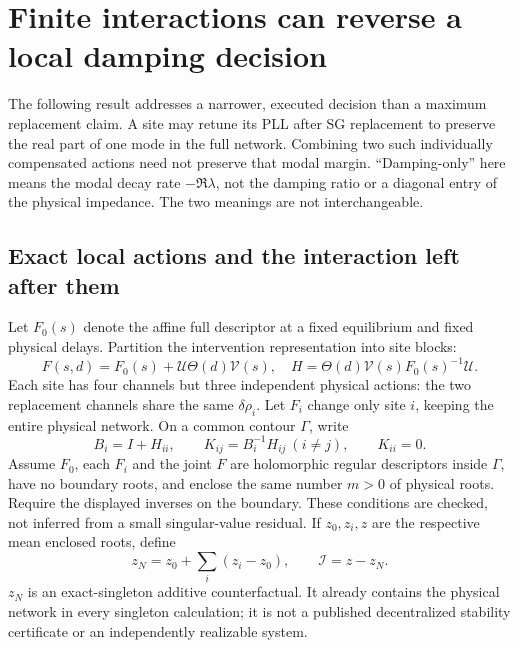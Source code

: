 \documentclass[11pt]{article}
\begin{document}
\section{Finite interactions can reverse a local damping decision}
\label{sec:decision}
The following result addresses a narrower, executed decision than a maximum
replacement claim. A site may retune its PLL after SG replacement to preserve
the real part of one mode in the full network. Combining two such individually
compensated actions need not preserve that modal margin. ``Damping-only'' here
means the modal decay rate $-\Re\lambda$, not the damping ratio or a diagonal
entry of the physical impedance. The two meanings are not interchangeable.

\subsection{Exact local actions and the interaction left after them}
Let $F_0(s)$ denote the affine full descriptor at a fixed equilibrium and fixed
physical delays. Partition the intervention representation into site blocks:
\begin{equation}
 F(s,d)=F_0(s)+\mathcal U\Theta(d)\mathcal V(s),\quad
 H=\Theta(d)\mathcal V(s)F_0(s)^{-1}\mathcal U .
\end{equation}
Each site has four channels but three independent physical actions: the two
replacement channels share the same $\delta\rho_i$. Let $F_i$ change only
site $i$, keeping the entire physical network. On a common contour $\Gamma$,
write
\begin{equation}
 B_i=I+H_{ii},\qquad K_{ij}=B_i^{-1}H_{ij}\ (i\ne j),\qquad K_{ii}=0.
\end{equation}
Assume $F_0$, each $F_i$ and the joint $F$ are holomorphic regular descriptors
inside $\Gamma$, have no boundary roots, and enclose the same number $m>0$ of
physical roots. Require the displayed inverses on the boundary. These
conditions are checked, not inferred from a small singular-value residual.
If $z_0,z_i,z$ are the respective mean enclosed roots, define
\begin{equation}
 z_N=z_0+\sum_i(z_i-z_0),\qquad \mathcal I=z-z_N .
 \label{eq:singleton-counterfactual}
\end{equation}
$z_N$ is an exact-singleton additive counterfactual. It already contains the
physical network in every singleton calculation; it is not a published
decentralized stability certificate or an independently realizable system.
\end{document}
